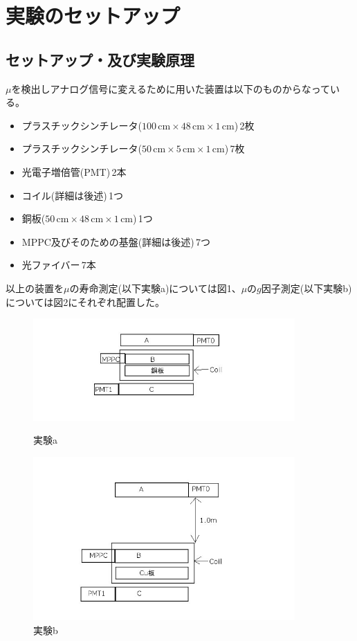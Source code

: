 \section{実験のセットアップ}
\subsection{セットアップ・及び実験原理}
$\mu$を検出しアナログ信号に変えるために用いた装置は以下のものからなっている。
\begin{itemize}
\item プラスチックシンチレータ($100\,\mathrm{cm} \times 48\,\mathrm{cm} \times1\,\mathrm{cm}$)\,2枚
\item プラスチックシンチレータ($50\,\mathrm{cm} \times 5\,\mathrm{cm} \times 1\,\mathrm{cm}$)\,7枚
\item 光電子増倍管(PMT)\,2本
\item コイル(詳細は後述)\,1つ
\item 銅板($50\,\mathrm{cm} \times 48\,\mathrm{cm} \times 1\,\mathrm{cm}$)\,1つ
\item MPPC及びそのための基盤(詳細は後述)\,7つ
\item 光ファイバー\,7本
\end{itemize}
以上の装置を$\mu$の寿命測定(以下実験a)については図1、$\mu$の$g$因子測定(以下実験b)については図2にそれぞれ配置した。
\begin{figure}[H]
 \begin{minipage}{0.5\hsize}
  \centering
  \includegraphics[width=10cm, bb=0 0 640 250,clip]{zikken_a.jpg}
  \caption{実験a}
 \end{minipage}
 \begin{minipage}{0.5\hsize}
  \centering
  \includegraphics[width=10cm, bb=0 0 640 400,clip]{zikken_b.jpg}
  \caption{実験b}
\end{minipage}
\end{figure}

